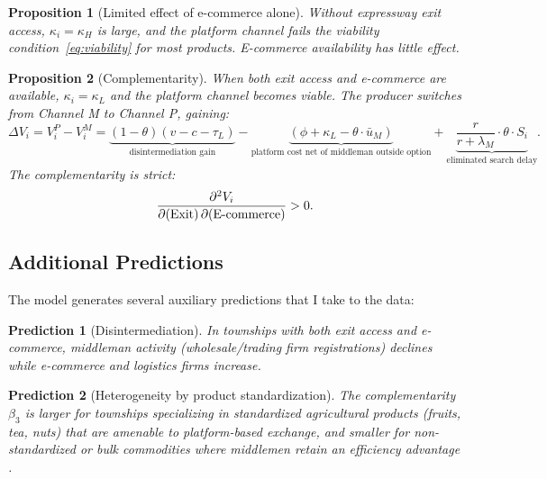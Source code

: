 \documentclass[12pt]{article}
\newtheorem{proposition}{Proposition}
\newtheorem{prediction}{Prediction}
\begin{document}
\begin{proposition}[Limited effect of e-commerce alone]\label{prop:ecom}
Without expressway exit access, $\kappa_i = \kappa_H$ is large, and the platform channel fails the viability condition~\eqref{eq:viability} for most products. E-commerce availability has little effect.
\end{proposition}

\begin{proposition}[Complementarity]\label{prop:complement}
When both exit access and e-commerce are available, $\kappa_i = \kappa_L$ and the platform channel becomes viable. The producer switches from Channel M to Channel P, gaining:
\begin{equation}
    \Delta V_i = V^P_i - V^M_i = \underbrace{(1-\theta)(v - c - \tau_L)}_{\text{disintermediation gain}} - \underbrace{(\phi + \kappa_L - \theta \cdot \bar{u}_M)}_{\text{platform cost net of middleman outside option}} + \underbrace{\frac{r}{r + \lambda_M} \cdot \theta \cdot S_i}_{\text{eliminated search delay}}.
\end{equation}
The complementarity is strict:
\begin{equation}
    \frac{\partial^2 V_i}{\partial(\text{Exit}) \, \partial(\text{E\text{-}commerce})} > 0.
\end{equation}
\end{proposition}

\subsection{Additional Predictions}

The model generates several auxiliary predictions that I take to the data:

\begin{prediction}[Disintermediation]\label{pred:disintermediation}
In townships with both exit access and e-commerce, middleman activity (wholesale/trading firm registrations) declines while e-commerce and logistics firms increase.
\end{prediction}

\begin{prediction}[Heterogeneity by product standardization]\label{pred:standardization}
The complementarity $\beta_3$ is larger for townships specializing in standardized agricultural products (fruits, tea, nuts) that are amenable to platform-based exchange, and smaller for non-standardized or bulk commodities where middlemen retain an efficiency advantage \citep{glode2020}.
\end{prediction}
\end{document}
